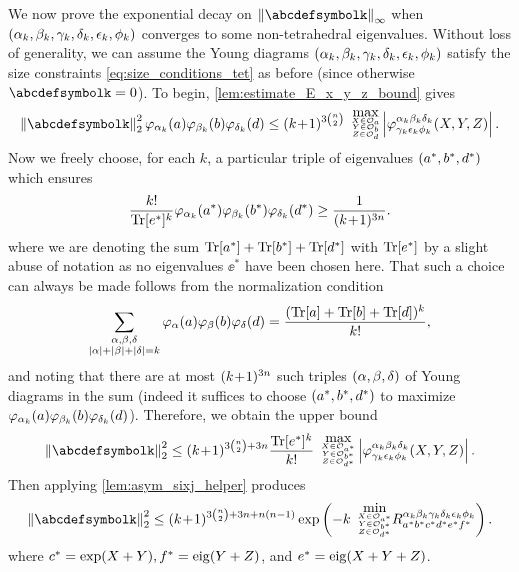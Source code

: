 \documentclass[notitlepage, 11pt, letterpaper]{amsart}
\begin{document}
We now prove the exponential decay on $\norm{\abcdefsymbolk}_{\infty}$ when $(\alpha_k,\beta_k,\gamma_k,\delta_k,\epsilon_k,\phi_k)$ converges to some non-tetrahedral eigenvalues.
Without loss of generality, we can assume the Young diagrams $(\alpha_k,\beta_k,\gamma_k,\delta_k,\epsilon_k,\phi_k)$ satisfy the size constraints \cref{eq:size_conditions_tet} as before (since otherwise $\abcdefsymbolk = 0$).
To begin, \cref{lem:estimate_E_x_y_z_bound} gives
\begin{equation}
    \norm{\abcdefsymbolk}_{2}^{2} \vp_{\ya_k}(\ea)\vp_{\yb_k}(\eb)\vp_{\yd_k}(\ed)
    \leq
    \polyk{3\binom{n}{2}}
    \tighttriplesubstack{\mathrm{max}}{X \in \orbit_{\ea}}{Y \in \orbit_{\eb}}{Z \in \orbit_{\ed}}
    \abs{\vp^{\ya_k\yb_k\yd_k}_{\yc_k\ye_k\yf_k}(X,Y,Z)}.
\end{equation}
Now we freely choose, for each $k$, a particular triple of eigenvalues $(a^*,b^*,d^*)$ which ensures
\begin{equation}
    \frac{k!}{\operatorname{Tr}[e^{*}]^k} \varphi_{\alpha_k}(a^*)\varphi_{\beta_k}(b^*)\varphi_{\delta_k}(d^*) \geq \frac{1}{(k\!+\!1)^{3n}}.
\end{equation}
where we are denoting the sum $\operatorname{Tr}[a^{*}]+\operatorname{Tr}[b^*]+\operatorname{Tr}[d^*]$ with $\operatorname{Tr}[e^{*}]$ by a slight abuse of notation as no eigenvalues $\ee^*$ have been chosen here.
That such a choice can always be made follows from the normalization condition
\begin{equation}
    \sum_{\substack{\alpha,\beta,\delta \\ |\alpha|+|\beta|+|\delta| = k}}\varphi_{\alpha}(a)\varphi_{\beta}(b)\varphi_{\delta}(d) = \frac{(\operatorname{Tr}[a]+\operatorname{Tr}[b]+\operatorname{Tr}[d])^k}{k!},
\end{equation}
and noting that there are at most $(k\!+\!1)^{3n}$ such triples $(\alpha,\beta,\delta)$ of Young diagrams in the sum (indeed it suffices to choose $(a^*,b^*,d^*)$ to maximize $\varphi_{\alpha_k}(a)\varphi_{\beta_k}(b)\varphi_{\delta_k}(d)$).
Therefore, we obtain the upper bound
\begin{equation}
    \norm{\abcdefsymbolk}_{2}^{2}
    \leq
    \polyk{3\binom{n}{2}+3n} \frac{\Tr[\ee^{*}]^k}{k!}
    \tighttriplesubstack{\mathrm{max}}{X \in \orbit_{\ea^{*}}}{Y \in \orbit_{\eb^{*}}}{Z \in \orbit_{\ed^{*}}}
    \abs{\vp^{\ya_k\yb_k\yd_k}_{\yc_k\ye_k\yf_k}(X,Y,Z)}.
\end{equation}
Then applying \cref{lem:asym_sixj_helper} produces
\begin{equation}
    \norm{\abcdefsymbolk}_{2}^{2}
    \leq
    \polyk{3\binom{n}{2}+3n + n(n-1)}
    \exp\left( - k
        \tighttriplesubstack{\mathrm{min}}{X \in \orbit_{\ea^{*}}}{Y \in \orbit_{\eb^{*}}}{Z \in \orbit_{\ed^{*}}}
        R_{\ea^{*}\eb^{*}\ec^{*}\ed^{*}\ee^{*}\ef^{*}}^{\ya_k\yb_k\yc_k\yd_k\ye_k\yf_k}
    \right).
\end{equation}
where $c^{*} = \exp(X+Y), f^{*} = \operatorname{eig}(Y+Z)$, and $e^{*} = \operatorname{eig}(X+Y+Z)$.
\end{document}
